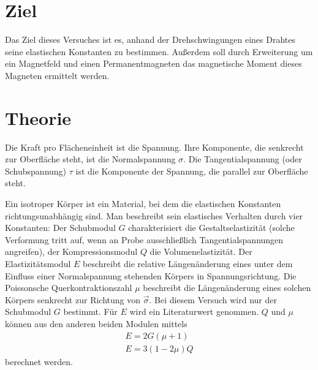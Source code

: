 



\tableofcontents
\newpage

\section{Ziel}
Das Ziel dieses Versuches ist es, anhand
der Drehschwingungen eines Drahtes seine
elastischen Konstanten zu bestimmen.
Außerdem soll durch Erweiterung um ein Magnetfeld und einen
Permanentmagneten das magnetische Moment
dieses Magneten ermittelt werden.

\section{Theorie}
Die Kraft pro Flächeneinheit ist die Spannung.
Ihre Komponente, die senkrecht zur Oberfläche  steht,
ist die Normalspannung $\sigma$.
Die Tangentialspannung (oder Schubspannung) $\tau$
ist die Komponente der Spannung, die parallel
zur Oberfläche steht.

\noindent Ein isotroper Körper ist ein Material, bei dem 
die elastischen Konstanten richtungsunabhängig
sind. Man beschreibt sein elastisches Verhalten durch
vier Konstanten: Der Schubmodul $G$ charakterisiert
die Gestaltselastizität (solche Verformung tritt auf,
wenn an Probe ausschließlich Tangentialspannungen
angreifen), der Kompressionsmodul $Q$
die Volumenelastizität. Der Elastizitätsmodul $E$
beschreibt die relative Längenänderung eines unter
dem Einfluss einer Normalspannung stehenden Körpers
in Spannungsrichtung.
Die Poissonsche Querkontraktionszahl $\mu$ beschreibt
die Längenänderung eines solchen Körpers senkrecht zur
Richtung von $\vec{\sigma}$.
Bei diesem Versuch wird nur der Schubmodul $G$
bestimmt. Für $E$ wird ein Literaturwert genommen.
$Q$ und $\mu$ können aus den anderen beiden Modulen
mittels
\begin{gather}
    E = 2G(\mu + 1) \\
    E = 3(1-2\mu)Q %
    \label{eqn:E}
\end{gather}
berechnet werden.

